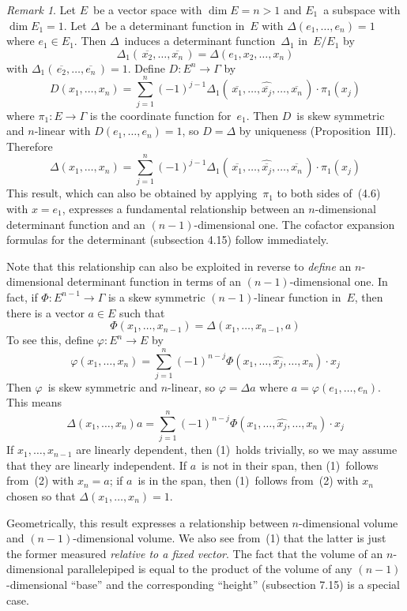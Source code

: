 \documentclass[letterpaper,12pt]{article}
\newcommand{\mult}{\cdot}
\newcommand{\proj}[1]{\overline{#1}}
\theoremstyle{definition}
\theoremstyle{remark}
\newtheorem*{rmk}{Remark}
\begin{document}
\begin{rmk}
Let \(E\)~be a vector space with \(\dim E=n>1\) and \(E_1\)~a subspace with \(\dim E_1=1\). Let \(\Delta\)~be a determinant function in~\(E\) with \(\Delta(e_1,\ldots,e_n)=1\) where \(e_1\in E_1\). Then \(\Delta\)~induces a determinant function~\(\Delta_1\) in~\(E/E_1\) by
\[\Delta_1(\,\proj{x_2},\ldots,\proj{x_n}\,)=\Delta(e_1,x_2,\ldots,x_n)\]
with \(\Delta_1(\,\proj{e_2},\ldots,\proj{e_n}\,)=1\). Define \(D:E^n\to\Gamma\) by
\[D(x_1,\ldots,x_n)=\sum_{j=1}^n (-1)^{j-1}\Delta_1(\,\proj{x_1},\ldots,\widehat{\proj{x_j}},\ldots,\proj{x_n}\,)\mult\pi_1(x_j)\]
where \(\pi_1:E\to\Gamma\) is the coordinate function for~\(e_1\). Then \(D\)~is skew symmetric and \(n\)-linear with \(D(e_1,\ldots,e_n)=1\), so \(D=\Delta\) by uniqueness (Proposition~III). Therefore
\[\boxed{\Delta(x_1,\ldots,x_n)=\sum_{j=1}^n (-1)^{j-1}\Delta_1(\,\proj{x_1},\ldots,\widehat{\proj{x_j}},\ldots,\proj{x_n}\,)\mult\pi_1(x_j)}\]
This result, which can also be obtained by applying~\(\pi_1\) to both sides of~(4.6) with \(x=e_1\), expresses a fundamental relationship between an \(n\)-dimensional determinant function and an \((n-1)\)-dimensional one. The cofactor expansion formulas for the determinant (subsection 4.15) follow immediately.

Note that this relationship can also be exploited in reverse to \emph{define} an \(n\)-dimensional determinant function in terms of an \((n-1)\)-dimensional one. In fact, if \(\Phi:E^{n-1}\to\Gamma\) is a skew symmetric \((n-1)\)-linear function in~\(E\), then there is a vector \(a\in E\) such that
\[\Phi(x_1,\ldots,x_{n-1})=\Delta(x_1,\ldots,x_{n-1},a)\tag{1}\]
To see this, define \(\varphi:E^n\to E\) by
\[\varphi(x_1,\ldots,x_n)=\sum_{j=1}^n (-1)^{n-j}\Phi(x_1,\ldots,\widehat{x_j},\ldots,x_n)\mult x_j\]
Then \(\varphi\)~is skew symmetric and \(n\)-linear, so \(\varphi=\Delta a\) where \(a=\varphi(e_1,\ldots,e_n)\). This means
\[\Delta(x_1,\ldots,x_n)a=\sum_{j=1}^n (-1)^{n-j}\Phi(x_1,\ldots,\widehat{x_j},\ldots,x_n)\mult x_j\tag{2}\]
If \(x_1,\ldots,x_{n-1}\) are linearly dependent, then (1)~holds trivially, so we may assume that they are linearly independent. If \(a\)~is not in their span, then (1)~follows from~(2) with \(x_n=a\); if \(a\)~is in the span, then (1)~follows from~(2) with \(x_n\) chosen so that \(\Delta(x_1,\ldots,x_n)=1\).

Geometrically, this result expresses a relationship between \(n\)-dimensional volume and \((n-1)\)-dimensional volume. We also see from~(1) that the latter is just the former measured \emph{relative to a fixed vector}. The fact that the volume of an \(n\)-dimensional parallelepiped is equal to the product of the volume of any \((n-1)\)-dimensional ``base'' and the corresponding ``height'' (subsection 7.15) is a special case.
\end{rmk}
\end{document}

